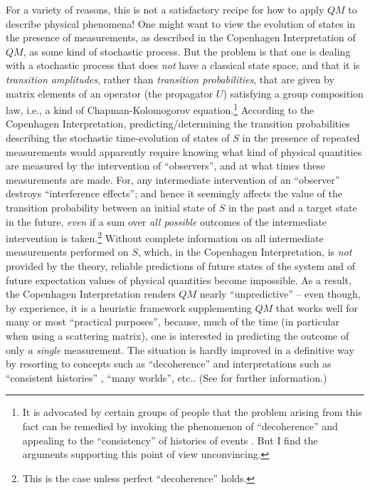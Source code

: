 \documentclass[12pt]{article}
\begin{document}
For a variety of reasons, this is not a satisfactory recipe for how to apply $QM$ to describe physical phenomena! One might want to view the evolution of states in the presence of measurements, as described in the Copenhagen Interpretation of $QM$, as some kind of stochastic process. But the problem is that one is dealing with a stochastic process that does \textit{not} have a classical state space, and that it is \textit{transition amplitudes}, rather than \textit{transition probabilities}, that are given by matrix elements of an operator (the propagator $U$) satisfying a group composition law, i.e., a kind of Chapman-Kolomogorov equation.\footnote{It is advocated by certain groups of people that the problem arising from this fact can be remedied by invoking the phenomenon of ``decoherence'' and appealing to the ``consistency'' of histories of events \cite{Griffiths}. But I find the arguments supporting this point of view unconvincing.} According to the Copenhagen Interpretation, predicting/determining the transition probabilities describing the stochastic time-evolution of states of $S$ in the presence of repeated measurements would apparently require knowing what kind of physical quantities are measured by the intervention of ``observers'', and at what times these measurements are made. For, any intermediate intervention of an ``observer'' destroys ``interference effects''; and hence it seemingly affects the value of the transition probability between an initial state of $S$ in the past and a target state in the future, \textit{even} if a sum over \textit{all possible} outcomes of the intermediate intervention is taken.\footnote{This is the case unless perfect ``decoherence'' holds.} Without complete information on all intermediate measurements performed on $S$, which, in the Copenhagen Interpretation, is \textit{not} provided by the theory, reliable predictions of future states of the system and of future expectation values of physical quantities become impossible. As a result, the Copenhagen Interpretation renders $QM$ nearly ``unpredictive'' -- even though, by experience, it is a heuristic framework supplementing $QM$ that works well for many or most ``practical purposes'', because, much of the time (in particular when using a scattering matrix), one is interested in predicting the outcome of only \textit{a single} measurement. The situation is hardly improved in a definitive way by resorting to concepts such as ``decoherence'' and interpretations such as ``consistent histories'' \cite{Griffiths}, ``many worlds'', etc.. (See \cite{Bell-book, Durr-Teufel} for further information.)
\end{document}
